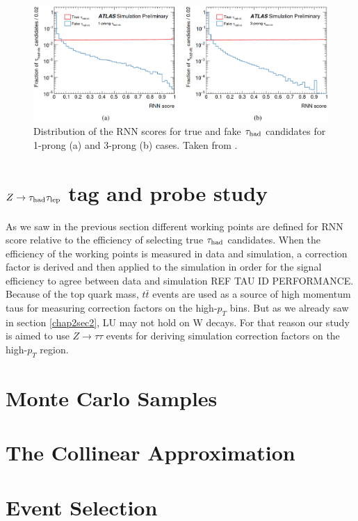 \begin{figure}[h]
	\centering
	\includegraphics[width=1\textwidth]{figures/Fig6}
	\caption{Distribution of the RNN scores for true and fake $\tau_\text{had}$ candidates for 1-prong (a) and 3-prong (b) cases. Taken from \cite{Deutsch:2680523}.}
	\label{Fig6}
\end{figure}
\section{$Z\to\tau_\text{had}\tau_\text{lep}$ tag and probe study}
As we saw in the previous section different working points are defined for RNN score relative to the efficiency of selecting true $\tau_\text{had}$ candidates. When the efficiency of the working points is measured in data and simulation, a correction factor is derived and then applied to the simulation in order for the signal efficiency to agree between data and simulation REF TAU ID PERFORMANCE. Because of the top quark mass, $t\bar{t}$ events are used as a source of high momentum taus for measuring correction factors on the high-$p_T$ bins. But as we already saw in section \ref{chap2sec2}, LU may not hold on W decays. For that reason our study is aimed to use $Z\to\tau\tau$ events for deriving simulation correction factors on the high-$p_T$ region.   

\section{Monte Carlo Samples}

\section{The Collinear Approximation}

\section{Event Selection}